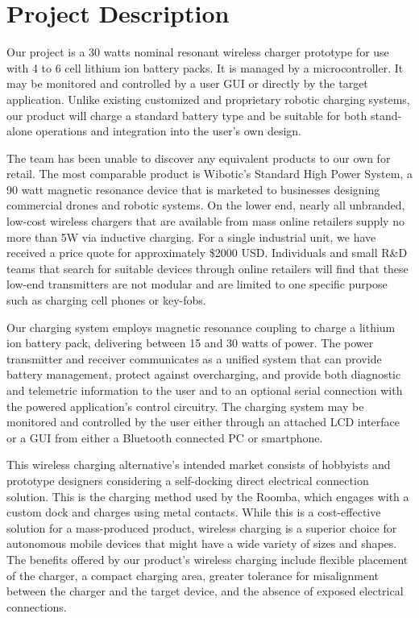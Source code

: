 \documentclass[12pt]{article}
\begin{document}

\section{Project Description}
\indent \indent
Our project is a 30 watts nominal resonant wireless charger prototype for use with 4 to 6 cell lithium ion battery packs. It is managed by a microcontroller. It may be monitored and controlled by a user GUI or directly by the target application. Unlike existing customized and proprietary robotic charging systems, our product will charge a standard battery type and be suitable for both stand-alone operations and integration into the user's own design.\\ \indent

The team has been unable to discover any equivalent products to our own for retail. The most comparable product is Wibotic's Standard High Power System\cite{WiboSHPS}, a 90 watt magnetic resonance device that is marketed to businesses designing commercial drones and robotic systems. On the lower end, nearly all unbranded, low-cost wireless chargers that are available from mass online retailers supply no more than 5W via inductive charging. For a single industrial unit, we have received a price quote for approximately \$2000 USD. Individuals and small R\&D teams that search for suitable devices through online retailers will find that these low-end transmitters are not modular and are limited to one specific purpose such as charging cell phones or key-fobs.\\ \indent

Our charging system employs magnetic resonance coupling to charge a lithium ion battery pack, delivering between 15 and 30 watts of power. The power transmitter and receiver communicates as a unified system that can provide battery management, protect against overcharging, and provide both diagnostic and telemetric information to the user and to an optional serial connection with the powered application’s control circuitry. The charging system may be monitored and controlled by the user either through an attached LCD interface or a GUI from either a Bluetooth connected PC or smartphone.\\ \indent

This wireless charging alternative's intended market consists of hobbyists and prototype designers considering a self-docking direct electrical connection solution. This is the charging method used by the Roomba\cite{RoombaEduData}, which engages with a custom dock and charges using metal contacts. While this is a cost-effective solution for a mass-produced product, wireless charging is a superior choice for autonomous mobile devices that might have a wide variety of sizes and shapes. The benefits offered by our product's wireless charging include flexible placement of the charger, a compact charging area, greater tolerance for misalignment between the charger and the target device, and the absence of exposed electrical connections.\\ \indent
\end{document}
